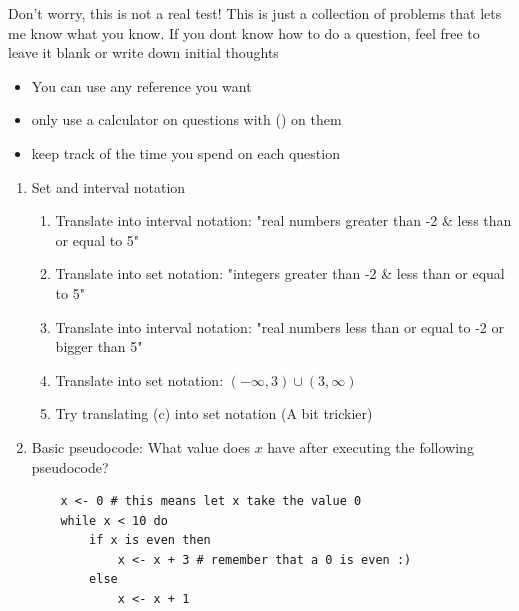 \documentclass[12pt]{article}
\begin{document}
Don't worry, this is not a real test! This is just a collection of problems that lets me know what you know. If you dont know how to do a question, feel free to leave it blank or write down initial thoughts
\begin{itemize}
    \item You can use any reference you want
    \item only use a calculator on questions with (\faCalculator)  on them
    \item keep track of the time you spend on each question
\end{itemize}

\hrulefill

\begin{enumerate}
    \item Set and interval notation 
    \begin{enumerate}
        \item Translate into interval notation: "real numbers greater than -2 \& less than or equal to 5"
        \vspace{1cm}
        \item Translate into set notation: "integers greater than -2 \& less than or equal to 5"
        \vspace{1cm}
        \item Translate into interval notation: "real numbers {less than or equal to} -2 or {bigger than} 5"
        \vspace{1cm}
        \item Translate into set notation: $(-\infty, 3) \cup (3, \infty)$
        \vspace{1cm}
        \item Try translating (c) into set notation (A bit trickier)
        \vspace{1cm}
    \end{enumerate}

    \item Basic pseudocode: What value does $x$ have after executing the following pseudocode?
    \begin{verbatim}
    x <- 0 # this means let x take the value 0
    while x < 10 do
        if x is even then
            x <- x + 3 # remember that a 0 is even :)
        else
            x <- x + 1
    \end{verbatim}
    \newpage


\end{enumerate}
\end{document}
